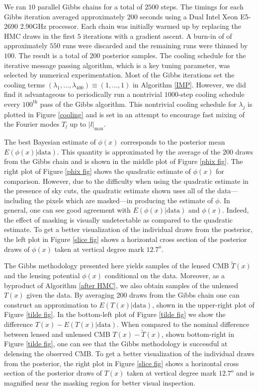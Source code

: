 \documentclass[iop,revtex4,apj,onecolumn]{emulateapj}
\begin{document}
 

We ran $10$ parallel Gibbs chains for a total of $2500$ steps. The timings for each Gibbs iteration averaged approximately 200 seconds using a Dual Intel Xeon E5-2690 2.90GHz processor. Each chain was initially warmed up by replacing the HMC draws in the first $5$ iterations with a gradient ascent. A burn-in of of approximately $550$ runs were discarded and the remaining runs were thinned by $100$. The result is a total of $200$ posterior samples. The cooling schedule for the iterative message passing algorithm, which is a key tuning parameter,  was selected by numerical experimentation.  Most of the Gibbs iterations set the cooling terms $(\lambda_1,\ldots, \lambda_{400}) \equiv (1,\ldots, 1)$  in Algorithm \ref{IMP}. However, we did find it advantageous to periodically run a nontrivial $1000$-step cooling schedule every $100^\text{th}$ pass of the Gibbs algorithm. This nontrivial cooling schedule for $\lambda_j$ is plotted in Figure \ref{cooling} and is set in an attempt to encourage fast mixing of the Fourier modes $T_l$ up to $|l|_\text{max}$. 



The best Bayesian estimate of $\phi(x)$ corresponds to the posterior mean $E(\phi(x) |\text{data})$. This quantity is approximated by the average of the $200$ draws from the Gibbs chain and is shown in the middle plot of Figure \ref{phix fig}.  The right plot of Figure \ref{phix fig} shows the quadratic estimate of $\phi(x)$ for comparison. However, due to the difficulty when using the quadratic estimate in the presence of sky cuts, the quadratic estimate shown uses all of the data---including the pixels which are masked---in producing the estimate of $\phi$. In general, one can see good agreement with $E(\phi(x) | \text{data})$  and $\phi(x)$. Indeed, the effect of masking is visually undetectable as compared to the quadratic estimate.  To get a better visualization of the individual draws from the posterior, the left plot in Figure \ref{slice fig} shows a horizontal cross section of the posterior draws of $\phi(x)$ taken at vertical degree mark $12.7^o$. 


The Gibbs methodology presented here yields samples of the lensed CMB $\widetilde T(x)$ and the lensing potential $\phi(x)$ conditional on the data. Moreover, as a byproduct of Algorithm \ref{after HMC}, we also obtain samples of the unlensed $T(x)$ given the data. By averaging $200$ draws from the Gibbs chain one can construct an approximation to $E(T(x) | \text{data})$, shown in the upper-right plot of Figure \ref{tilde fig}. In the bottom-left plot of Figure \ref{tilde fig} we show the  difference $T(x) - E(T(x) | \text{data})$.
When compared to the nominal difference between lensed and unlensed CMB $T(x) - \widetilde T(x)$, shown bottom-right in Figure \ref{tilde fig}, one can see that the Gibbs methodology is successful at delensing the observed CMB. To get a better visualization of the individual draws from the posterior, the right plot in Figure \ref{slice fig} shows a horizontal cross section of the posterior draws of $T(x)$ taken at vertical degree mark $12.7^o$ and is magnified near the masking region for better visual inspection.  
\end{document}
